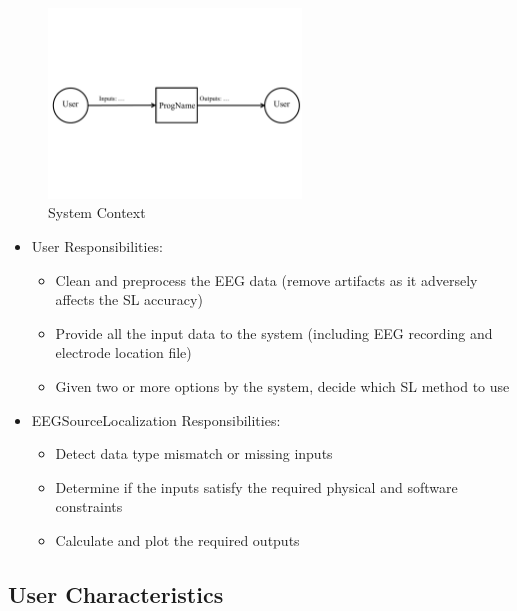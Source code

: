 \documentclass[12pt]{article}
\renewcommand{\progname}{EEGSourceLocalization}
\begin{document}
\begin{figure}[h!]
\begin{center}
 \includegraphics[width=0.6\textwidth]{SystemContextFigure}
\caption{System Context}
\label{Fig_SystemContext} 
\end{center}
\end{figure}


\begin{itemize}
\item User Responsibilities:
\begin{itemize} 
\item  Clean and preprocess the EEG data (remove artifacts as it adversely affects the SL accuracy)
\item  Provide all the input data to the system (including EEG recording and electrode location file) 
\item  Given two or more options by the system, decide which SL method to use
\end{itemize}

\item \progname{} Responsibilities:
\begin{itemize}
\item Detect data type mismatch or missing inputs
\item Determine if the inputs satisfy the required physical and software constraints
\item Calculate and plot the required outputs
\end{itemize}
\end{itemize}

\subsection{User Characteristics} \label{SecUserCharacteristics}
\end{document}
